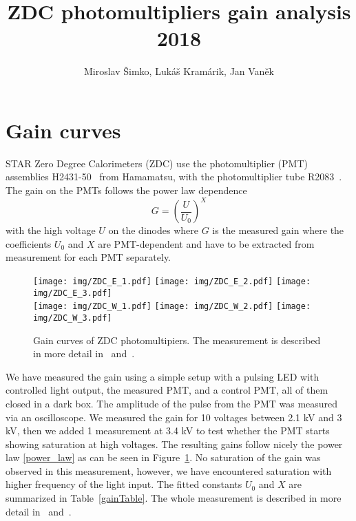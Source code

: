 \documentclass[a4paper,10pt]{article}
\title{ZDC photomultipliers gain analysis 2018}
\author{Miroslav Šimko, Lukáš Kramárik, Jan Vaněk}
\date{}
\begin{document}
\maketitle

\section{Gain curves}
STAR Zero Degree Calorimeters (ZDC) use the photomultiplier (PMT) assemblies H2431-50~\cite{H2431} from Hamamatsu, with the photomultiplier tube R2083~\cite{R2083}. The gain on the PMTs follows the power law dependence
\begin{equation} \label{power_law}
G = \left(\frac{U}{U_0} \right)^X
\end{equation}
with the high voltage $U$ on the dinodes where $G$ is the measured gain where the coefficients $U_0$ and $X$ are PMT-dependent and have to be extracted from measurement for each PMT separately.

\begin{figure}[htb]
\begin{center}
\texttt{[image: img/ZDC\_E\_1.pdf]}
\texttt{[image: img/ZDC\_E\_2.pdf]}
\texttt{[image: img/ZDC\_E\_3.pdf]}\\
\texttt{[image: img/ZDC\_W\_1.pdf]}
\texttt{[image: img/ZDC\_W\_2.pdf]}
\texttt{[image: img/ZDC\_W\_3.pdf]}
\end{center}
\caption{\label{gainCurves}Gain curves of ZDC photomultipiers. The measurement is described in more detail in~\cite{table} and~\cite{ZDC_PMT_presentation}.}
\end{figure}

We have measured the gain using a simple setup with a pulsing LED with controlled light output, the measured PMT, and a control PMT, all of them closed in a dark box. The amplitude of the pulse from the PMT was measured via an oscilloscope. We measured the gain for 10 voltages between 2.1 kV and 3 kV, then we added 1 measurement at 3.4 kV to test whether the PMT starts showing saturation at high voltages\@. The resulting gains follow nicely the power law \eqref{power_law} as can be seen in Figure~\ref{gainCurves}. No saturation of the gain was observed in this measurement, however, we have encountered saturation with higher frequency of the light input. The fitted constants $U_0$ and $X$ are summarized in Table~\ref{gainTable}. The whole measurement is described in more detail in~\cite{table} and~\cite{ZDC_PMT_presentation}.
\end{document}
